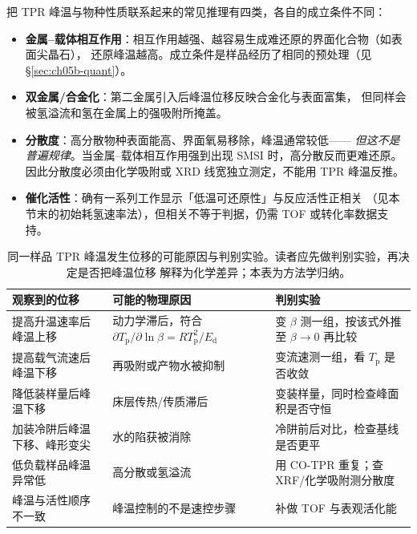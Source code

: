 \begin{principle}
把 TPR 峰温与物种性质联系起来的常见推理有四类，各自的成立条件不同：

\begin{itemize}
  \item \textbf{金属--载体相互作用}：相互作用越强、越容易生成难还原的界面化合物（如表面尖晶石），
        还原峰温越高。成立条件是样品经历了相同的预处理（见 \S\ref{sec:ch05b-quant}）。
  \item \textbf{双金属/合金化}：第二金属引入后峰温位移反映合金化与表面富集，
        但同样会被氢溢流和氢在金属上的强吸附所掩盖。
  \item \textbf{分散度}：高分散物种表面能高、界面氧易移除，峰温通常较低——
        \emph{但这不是普遍规律}。当金属--载体相互作用强到出现 SMSI 时，高分散反而更难还原。
        因此分散度必须由化学吸附或 XRD 线宽独立测定，不能用 TPR 峰温反推。
  \item \textbf{催化活性}：确有一系列工作显示「低温可还原性」与反应活性正相关
        （见本节末的初始耗氢速率法），但相关不等于判据，仍需 TOF 或转化率数据支持。
\end{itemize}
\end{principle}

\begin{table}[htbp]
\centering
\caption{同一样品 TPR 峰温发生位移的可能原因与判别实验。读者应先做判别实验，再决定是否把峰温位移
解释为化学差异；本表为方法学归纳。
}
\label{tab:ch05b-tpr-shift}
\small
\begin{tabular}{@{}p{34mm}p{50mm}p{54mm}@{}}
\toprule
观察到的位移 & 可能的物理原因 & 判别实验 \\
\midrule
提高升温速率后峰温上移 & 动力学滞后，符合
$\partial T_{\mathrm p}/\partial\ln\beta=RT_{\mathrm p}^{2}/E_{\mathrm d}$ &
变 $\beta$ 测一组，按该式外推至 $\beta\to0$ 再比较 \\
提高载气流速后峰温下移 & 再吸附或产物水被抑制 & 变流速测一组，看 $T_{\mathrm p}$ 是否收敛 \\
降低装样量后峰温下移 & 床层传热/传质滞后 & 变装样量，同时检查峰面积是否守恒 \\
加装冷阱后峰温下移、峰形变尖 & 水的陷获被消除 & 冷阱前后对比，检查基线是否更平 \\
低负载样品峰温异常低 & 高分散或氢溢流 & 用 CO-TPR 重复；查 XRF/化学吸附测分散度 \\
峰温与活性顺序不一致 & 峰温控制的不是速控步骤 & 补做 TOF 与表观活化能 \\
\bottomrule
\end{tabular}
\end{table}


